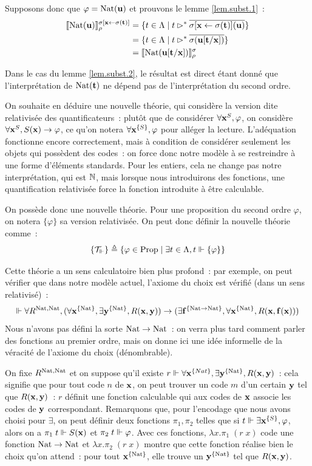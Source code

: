 \documentclass{article}
\begin{document}
Supposons donc que $\varphi = \mathrm{Nat}(\mathbf{u})$ et prouvons le lemme \ref{lem.subst.1}~:
\begin{align*}
    \llbracket \mathrm{Nat}(\mathbf{u}) \rrbracket_\rho^{\sigma[\mathbf{x}\leftarrow \sigma(\mathbf{t})]} &= \{t \in \Lambda\mid t \rhd^* \overline{\sigma[\mathbf{x}\leftarrow\sigma(\mathbf{t})](\mathbf{u})}\}\\
    &= \{ t \in \Lambda\mid t \rhd^* \overline{\sigma(\mathbf{u}[\mathbf{t}/\mathbf{x}])}\}\\
    &= \llbracket \mathrm{Nat}(\mathbf{u}[\mathbf{t}/\mathbf{x}]) \rrbracket_\rho^\sigma
\end{align*}

Dans le cas du lemme \ref{lem.subst.2}, le résultat est direct étant donné que l'interprétation de $\mathrm{Nat}(\mathbf{t})$ ne dépend pas de l'interprétation du second ordre.

On souhaite en déduire une nouvelle théorie, qui considère la version dite relativisée des quantificateurs~: plutôt que de considérer $\forall \mathbf{x}^S, \varphi$, on considère $\forall \mathbf{x}^S, S(\mathbf{x}) \to \varphi$, ce qu'on notera $\forall \mathbf{x}^{\{S\}}, \varphi$ pour alléger la lecture. L'adéquation fonctionne encore correctement, mais à condition de considérer seulement les objets qui possèdent des codes~: on force donc notre modèle à se restreindre à une forme d'éléments standards. Pour les entiers, cela ne change pas notre interprétation, qui est $\mathbb{N}$, mais lorsque nous introduirons des fonctions, une quantification relativisée force la fonction introduite à être calculable.

On possède donc une nouvelle théorie. Pour une proposition du second ordre $\varphi$, on notera $\{\varphi\}$ sa version relativisée. On peut donc définir la nouvelle théorie comme~:
\[\{\mathcal T_\Vdash\} \triangleq \{\varphi \in \mathrm{Prop}\mid \exists t \in \Lambda, t \Vdash\{\varphi\}\}\]

Cette théorie a un sens calculatoire bien plus profond~: par exemple, on peut vérifier que dans notre modèle actuel, l'axiome du choix est vérifié (dans un sens relativisé)~:
\[\Vdash \forall R^{\mathrm{Nat},\mathrm{Nat}},(\forall \mathbf{x}^{\{\mathrm{Nat}\}}, \exists \mathbf{y}^{\{\mathrm{Nat}\}}, R(\mathbf{x},\mathbf{y}))\to (\exists \mathbf{f}^{\{\mathrm{Nat}\to\mathrm{Nat}\}}, \forall \mathbf{x}^{\{\mathrm{Nat}\}}, R(\mathbf{x},\mathbf{f}(\mathbf{x})))\]
Nous n'avons pas défini la sorte $\mathrm{Nat}\to\mathrm{Nat}$~: on verra plus tard comment parler des fonctions au premier ordre, mais on donne ici une idée informelle de la véracité de l'axiome du choix (dénombrable).

On fixe $R^{\mathrm{Nat},\mathrm{Nat}}$ et on suppose qu'il existe $r\Vdash \forall \mathbf{x}^{\{Nat\}}, \exists \mathbf{y}^{\{\mathrm{Nat}\}}, R(\mathbf{x},\mathbf{y})$~: cela signifie que pour tout code $n$ de $\mathbf{x}$, on peut trouver un code $m$ d'un certain $\mathbf{y}$ tel que $R(\mathbf{x},\mathbf{y})$~: $r$ définit une fonction calculable qui aux codes de $\mathbf{x}$ associe les codes de $\mathbf{y}$ correspondant. Remarquons que, pour l'encodage que nous avons choisi pour $\exists$, on peut définir deux fonctions $\pi_1,\pi_2$ telles que si $t \Vdash \exists \mathbf{x}^{\{S\}}, \varphi$, alors on a $\pi_1\;t\Vdash S(\mathbf{x})$ et $\pi_2\;t\Vdash \varphi$. Avec ces fonctions, $\lambda x.\pi_1\;(r\;x)$ code une fonction $\mathrm{Nat}\to\mathrm{Nat}$ et $\lambda x.\pi_2\;(r\;x)$ montre que cette fonction réalise bien le choix qu'on attend~: pour tout $\mathbf{x}^{\{\mathrm{Nat}\}}$, elle trouve un $\mathbf{y}^{\{\mathrm{Nat}\}}$ tel que $R(\mathbf{x},\mathbf{y})$.
\end{document}

